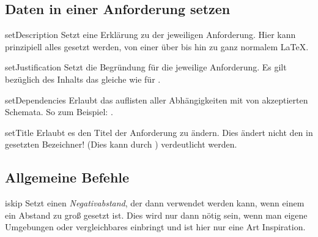 \documentclass{sopra-base}
\begin{document}
\subsection{Daten in einer Anforderung setzen}

 

\begin{command}{setDescription}{}
    Setzt eine Erklärung zu der jeweiligen Anforderung. Hier kann prinzipiell alles gesetzt werden, von einer  über  bis hin zu ganz normalem LaTeX.
\end{command}

\begin{command}{setJustification}{}
    Setzt die Begründung für die jeweilige Anforderung. Es gilt bezüglich des Inhalts das gleiche wie für .
\end{command}

\begin{command}{setDependencies}{}
    Erlaubt das auflisten aller Abhängigkeiten mit von  akzeptierten Schemata. So zum Beispiel: .
\end{command}

\begin{command}{setTitle}{}
    Erlaubt es den Titel der Anforderung zu ändern. Dies ändert nicht den in  gesetzten Bezeichner! (Dies kann durch ) verdeutlicht werden. 
\end{command}

\subsection{Allgemeine Befehle}

\begin{command}{iskip}{}
    Setzt einen \emph{Negativabstand}, der dann verwendet werden kann, wenn einem ein Abstand zu groß gesetzt ist. Dies wird nur dann nötig sein, wenn man eigene Umgebungen oder vergleichbares einbringt und ist hier nur eine Art Inspiration.
\end{command}
\end{document}
